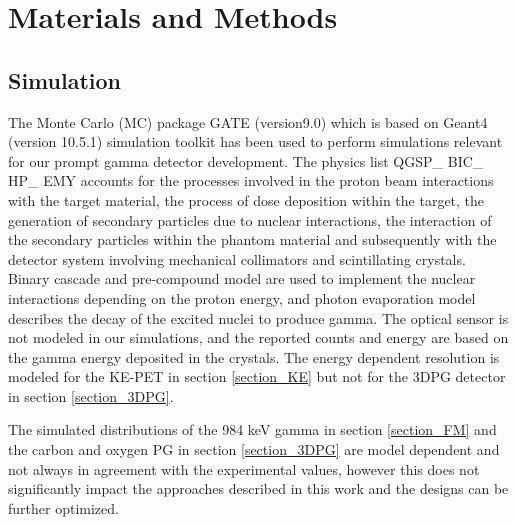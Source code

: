 \documentclass[11pt,a4paper]{article}
\begin{document}
\section{Materials and Methods \label{Setup}} \label{section_Materials}

\subsection{Simulation}
The Monte Carlo (MC) package GATE (version9.0) \cite{GATE} which is based on Geant4 (version 10.5.1)  simulation toolkit \cite{Geant4} has been used to perform simulations relevant for our prompt gamma detector  development. The physics list QGSP\_ BIC\_ HP\_ EMY  \cite{Geant4-physicslist} accounts for the processes involved in the proton beam interactions with the target material, the process of dose deposition within the target, the generation of secondary particles due to nuclear interactions, the interaction of the secondary particles within the phantom material and subsequently with the detector system involving mechanical collimators and scintillating crystals. Binary cascade and pre-compound model are used to implement the nuclear interactions depending on the proton energy, and photon evaporation model describes the decay of the excited nuclei to produce gamma. The optical sensor is not modeled in our simulations, and the reported counts and energy are based on the gamma energy deposited in the crystals. The energy dependent resolution is modeled for the KE-PET in section \ref{section_KE} but not for the 3DPG detector in section \ref{section_3DPG}. %

The simulated distributions of the 984 keV gamma in section \ref{section_FM} and the carbon and oxygen PG in section \ref{section_3DPG} are model dependent and not always  in agreement with the experimental values, however this does not significantly impact the approaches described in this work and the designs can be further optimized.
\end{document}
